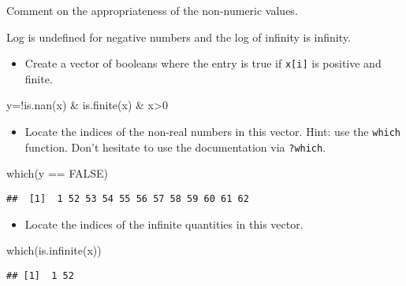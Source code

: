 \documentclass[
]{article}
\newenvironment{Shaded}{\begin{snugshade}}{\end{snugshade}}
\newcommand{\ConstantTok}[1]{\textcolor[rgb]{0.00,0.00,0.00}{#1}}
\newcommand{\DecValTok}[1]{\textcolor[rgb]{0.00,0.00,0.81}{#1}}
\newcommand{\FunctionTok}[1]{\textcolor[rgb]{0.00,0.00,0.00}{#1}}
\newcommand{\NormalTok}[1]{#1}
\newcommand{\OtherTok}[1]{\textcolor[rgb]{0.56,0.35,0.01}{#1}}
\newcommand{\SpecialCharTok}[1]{\textcolor[rgb]{0.00,0.00,0.00}{#1}}
\providecommand{\tightlist}{%
  \setlength{\itemsep}{0pt}\setlength{\parskip}{0pt}}
\begin{document}
Comment on the appropriateness of the non-numeric values.

Log is undefined for negative numbers and the log of infinity is
infinity.

\begin{itemize}
\tightlist
\item
  Create a vector of booleans where the entry is true if
  \texttt{x{[}i{]}} is positive and finite.
\end{itemize}

\begin{Shaded}
\begin{Highlighting}[]
\NormalTok{y}\OtherTok{=}\SpecialCharTok{!}\FunctionTok{is.nan}\NormalTok{(x) }\SpecialCharTok{\&} \FunctionTok{is.finite}\NormalTok{(x) }\SpecialCharTok{\&}\NormalTok{ x}\SpecialCharTok{\textgreater{}}\DecValTok{0}
\end{Highlighting}
\end{Shaded}

\begin{itemize}
\tightlist
\item
  Locate the indices of the non-real numbers in this vector. Hint: use
  the \texttt{which} function. Don't hesitate to use the documentation
  via \texttt{?which}.
\end{itemize}

\begin{Shaded}
\begin{Highlighting}[]
\FunctionTok{which}\NormalTok{(y }\SpecialCharTok{==} \ConstantTok{FALSE}\NormalTok{)}
\end{Highlighting}
\end{Shaded}

\begin{verbatim}
##  [1]  1 52 53 54 55 56 57 58 59 60 61 62
\end{verbatim}

\begin{itemize}
\tightlist
\item
  Locate the indices of the infinite quantities in this vector.
\end{itemize}

\begin{Shaded}
\begin{Highlighting}[]
\FunctionTok{which}\NormalTok{(}\FunctionTok{is.infinite}\NormalTok{(x))}
\end{Highlighting}
\end{Shaded}

\begin{verbatim}
## [1]  1 52
\end{verbatim}
\end{document}
